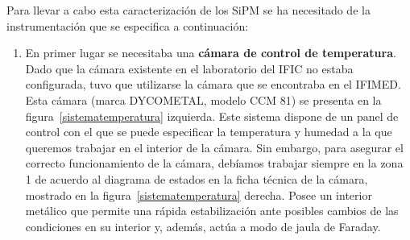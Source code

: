 Para llevar a cabo esta caracterización de los SiPM se ha necesitado de la instrumentación que se especifica a continuación:

\begin{enumerate}
\item {} En primer lugar se necesitaba una \textbf{cámara de control de temperatura}. 
\newline
Dado que la cámara existente en el laboratorio del IFIC no estaba configurada, tuvo que utilizarse la cámara que se encontraba en el IFIMED. Esta cámara (marca DYCOMETAL, modelo CCM 81) se presenta en la figura~\ref{sistematemperatura} izquierda.
Este sistema dispone de un panel de control con el que se puede especificar la temperatura y humedad a la que queremos trabajar en el interior de la cámara. Sin embargo, para asegurar el correcto funcionamiento de la cámara, debíamos trabajar siempre en la zona 1 de acuerdo al diagrama de estados  en la ficha técnica de la cámara, mostrado en la figura~\ref{sistematemperatura} derecha. Posee un interior metálico que permite una rápida estabilización ante posibles cambios de las condiciones en su interior y, además, actúa a modo de jaula de Faraday. 


\end{enumerate}

